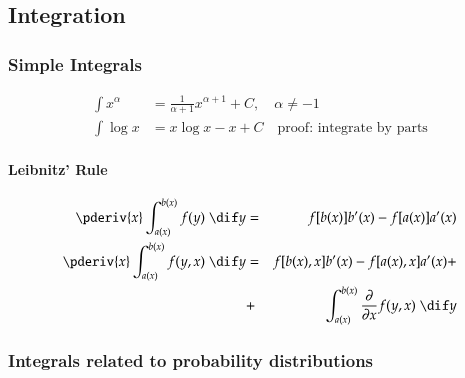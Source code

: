 \documentclass[a4paper]{article}
\numberwithin{equation}{subsection}
\begin{document}
\subsection{Integration}

\subsubsection{Simple Integrals}
\label{sec:simple_integrals}

\begin{align*}
  \int x^{\alpha} &= \frac{1}{\alpha + 1} x^{\alpha+1} + C,
  \quad \alpha \not= -1
  \\
  \int \log x &= x \log x -x + C
                \quad \text{proof: integrate by parts}
\end{align*}

\paragraph{Leibnitz' Rule}
\begin{eqnarray}
  \pderiv{x}
  \int_{a(x)}^{b(x)} f(y) \;\dif y
  & = &
  f[b(x)] b'(x) - f[a(x)]a'(x)\\
%
  \pderiv{x}
  \int_{a(x)}^{b(x)} f(y,x) \;\dif y 
  & = &
  f[b(x),x] b'(x) - f[a(x),x]a'(x) + \notag\\
  & + & 
  \int_{a(x)}^{b(x)} \frac{\partial}{\partial x} f(y,x) \;\dif y
\end{eqnarray}



\subsubsection{Integrals related to probability distributions}
\end{document}
